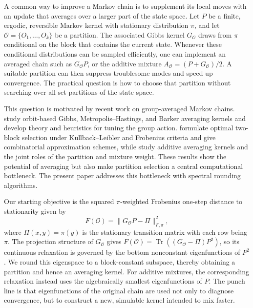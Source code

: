 \documentclass[11pt]{article}
\newcommand{\1}{\mathbf{1}}
\begin{document}
A common way to improve a Markov chain is to supplement its local
moves with an update that averages over a larger part of the state
space.  Let $P$ be a finite, ergodic, reversible Markov kernel with
stationary distribution $\pi$, and let
$\mathcal O=\{O_1,\ldots,O_k\}$ be a partition.  The associated Gibbs
kernel $G_{\mathcal O}$ draws from $\pi$ conditional on the block that
contains the current state.  Whenever these conditional distributions
can be sampled efficiently, one can implement an averaged
chain such as $G_{\mathcal O}P$, or the additive mixture
$A_{\mathcal O}=(P+G_{\mathcal O})/2$.  A suitable partition can then
suppress troublesome modes and speed up convergence.  The practical
question is how to choose that partition without searching over all
set partitions of the state space.

This question is motivated by recent work on group-averaged Markov
chains.  \citet{ChoiLimWang2025GroupAveragedII} study orbit-based Gibbs,
Metropolis--Hastings, and Barker averaging kernels and develop theory
and heuristics for tuning the group action.  \citet{LimChoi2026TwoBlock}
formulate optimal two-block selection under Kullback--Leibler and
Frobenius criteria and give combinatorial approximation schemes, while
\citet{LimChoi2026Additive} study additive averaging kernels and the
joint roles of the partition and mixture weight.  These results show
the potential of averaging but also make partition selection a central
computational bottleneck.  The present paper addresses this bottleneck
with spectral rounding algorithms.

Our starting objective is the squared $\pi$-weighted Frobenius one-step distance to stationarity given by
\[
    F(\mathcal O)=\|G_{\mathcal O}P-\Pi\|_{F,\pi}^2,
\]
where $\Pi(x,y) = \pi(y)$ is the stationary transition matrix with each row being $\pi$.  The projection structure of
$G_{\mathcal O}$ gives
$F(\mathcal O)=\operatorname{Tr}((G_{\mathcal O}-\Pi)P^2)$, so its
continuous relaxation is governed by the bottom nonconstant
eigenfunctions of $P^2$.  We round this eigenspace to a block-constant
subspace, thereby obtaining a partition and hence an averaging kernel.
For additive mixtures, the corresponding relaxation instead uses the
algebraically smallest eigenfunctions of $P$.  The punch line is that
eigenfunctions of the original chain are used not only to diagnose
convergence, but to construct a new, simulable kernel intended to mix
faster.

\end{document}
